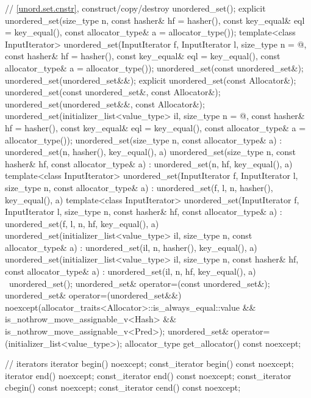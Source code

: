 \begin{codeblock}
{{    // \ref{unord.set.cnstr}, construct/copy/destroy
    unordered_set();
    explicit unordered_set(size_type n,
                           const hasher& hf = hasher(),
                           const key_equal& eql = key_equal(),
                           const allocator_type& a = allocator_type());
    template<class InputIterator>
      unordered_set(InputIterator f, InputIterator l,
                    size_type n = @\seebelow@,
                    const hasher& hf = hasher(),
                    const key_equal& eql = key_equal(),
                    const allocator_type& a = allocator_type());
    unordered_set(const unordered_set&);
    unordered_set(unordered_set&&);
    explicit unordered_set(const Allocator&);
    unordered_set(const unordered_set&, const Allocator&);
    unordered_set(unordered_set&&, const Allocator&);
    unordered_set(initializer_list<value_type> il,
                  size_type n = @\seebelow@,
                  const hasher& hf = hasher(),
                  const key_equal& eql = key_equal(),
                  const allocator_type& a = allocator_type());
    unordered_set(size_type n, const allocator_type& a)
      : unordered_set(n, hasher(), key_equal(), a) { }
    unordered_set(size_type n, const hasher& hf, const allocator_type& a)
      : unordered_set(n, hf, key_equal(), a) { }
    template<class InputIterator>
      unordered_set(InputIterator f, InputIterator l, size_type n, const allocator_type& a)
        : unordered_set(f, l, n, hasher(), key_equal(), a) { }
    template<class InputIterator>
      unordered_set(InputIterator f, InputIterator l, size_type n, const hasher& hf,
                    const allocator_type& a)
      : unordered_set(f, l, n, hf, key_equal(), a) { }
    unordered_set(initializer_list<value_type> il, size_type n, const allocator_type& a)
      : unordered_set(il, n, hasher(), key_equal(), a) { }
    unordered_set(initializer_list<value_type> il, size_type n, const hasher& hf,
                  const allocator_type& a)
      : unordered_set(il, n, hf, key_equal(), a) { }
    ~unordered_set();
    unordered_set& operator=(const unordered_set&);
    unordered_set& operator=(unordered_set&&)
      noexcept(allocator_traits<Allocator>::is_always_equal::value &&
               is_nothrow_move_assignable_v<Hash> &&
               is_nothrow_move_assignable_v<Pred>);
    unordered_set& operator=(initializer_list<value_type>);
    allocator_type get_allocator() const noexcept;

    // iterators
    iterator       begin() noexcept;
    const_iterator begin() const noexcept;
    iterator       end() noexcept;
    const_iterator end() const noexcept;
    const_iterator cbegin() const noexcept;
    const_iterator cend() const noexcept;

}}
\end{codeblock}
